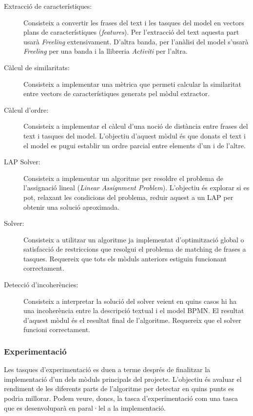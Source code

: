 \documentclass[10pt,a4paper]{article}
\begin{document}
\begin{description}
    \item[Extracció de característiques:]{Consisteix a convertir les frases del text i les tasques del model en vectors plans de característiques (\emph{features}). Per l'extracció del text aquesta part usarà \emph{Freeling} extensivament. D'altra banda, per l'anàlisi del model s'usarà \emph{Freeling} per una banda i la llibreria \emph{Activiti} per l'altra.}
    \item[Càlcul de similaritats:]{Consisteix a implementar una mètrica que permeti calcular la similaritat entre vectors de característiques generats pel mòdul extractor.}
    \item[Càlcul d'ordre:]{Consisteix a implementar el càlcul d'una noció de distància entre frases del text i tasques del model. L'objectiu d'aquest mòdul és que donats el text i el model es pugui establir un ordre parcial entre elements d'un i de l'altre.}
    \item[LAP Solver:]{Consisteix a implementar un algoritme per resoldre el problema de l'assignació lineal (\emph{Linear Assignment Problem}). L'objectiu és explorar si es pot, relaxant les condicions del problema, reduir aquest a un LAP per obtenir una solució aproximada.}
    \item[Solver:]{Consisteix a utilitzar un algoritme ja implementat d'optimització global o satisfacció de restriccions que resolgui el problema de matching de frases a tasques. Requereix que tots els mòduls anteriors estiguin funcionant correctament.}
    \item[Detecció d'incoherències:]{Consisteix a interpretar la solució del solver veient en quins casos hi ha una incoherència entre la descripció textual i el model BPMN. El resultat d'aquest mòdul és el resultat final de l'algoritme. Requereix que el solver funcioni correctament.}
\end{description}

\subsubsection{Experimentació}

Les tasques d'experimentació es duen a terme després de finalitzar la implementació d'un dels mòduls principals del projecte. L'objectiu és avaluar el rendiment de les diferents parts de l'algoritme per detectar en quins punts es podria millorar. Podem veure, doncs, la tasca d'experimentació com una tasca que es desenvoluparà en paral·lel a la implementació.
\end{document}
